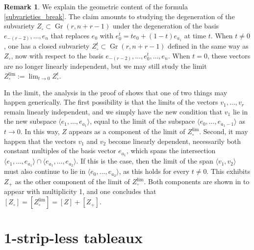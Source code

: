 \documentclass[11pt]{article}
\theoremstyle{definition}
\newtheorem{rema}[theo]{Remark}
\numberwithin{equation}{section}
\DeclareMathOperator{\Gr}{Gr}
\begin{document}

\begin{rema}\label{subvarieties_break_rmk}
We explain the geometric content of the formula \eqref{subvarieties_break}. The claim amounts to studying the degeneration of the subvariety $Z_\circ\subset \Gr(r,n+r-1)$ under the degeneration of the basis $e_{-(r-2)},\ldots,e_n$ that replaces $e_0$ with $e_0^t=te_0+(1-t)e_{a_1}$ at time $t$. When $t\neq0$, one has a closed subvariety $Z^t_\circ\subset \Gr(r,n+r-1)$ defined in the same way as $Z_\circ$, now with respect to the basis $e_{-(r-2)},\ldots,e_0^t,\ldots,e_n$. When $t=0$, these vectors are no longer linearly independent, but we may still study the limit $Z^{\lim}_\circ:=\lim_{t\to 0}Z^t_\circ$.

In the limit, the analysis in the proof of \cite[Theorem 3.32]{Cos09} shows  that one of two things may happen generically. The first possibility is that the limits of the vectors $v_1,\ldots,v_r$ remain linearly independent, and we simply have the new condition that $v_1$ lie in the new subspace $\langle e_1,\ldots,e_{a_1}\rangle$, equal to the limit of the subspace $\langle e_0,\ldots,e_{a_1-1}\rangle$ as $t\to 0$. In this way, $Z$ appears as a component of the limit of $Z^{\lim}_\circ$. Second, it may happen that the vectors $v_1$ and $v_2$ become linearly dependent, necessarily both constant multiples of the basis vector $e_{a_1}$, which spans the intersection $\langle e_1,\ldots,e_{a_1}\rangle\cap \langle e_{a_1},\ldots,e_{a_2}\rangle$. If this is the case, then the limit of the span $\langle v_1,v_2\rangle$ must also continue to lie in $\langle e_0,\ldots,e_{a_2}\rangle$, as this holds for every $t\neq0$. This exhibits $Z_+$ as the other component of the limit of $Z^{\lim}_\circ$. Both components are shown in \cite{Cos09} to appear with multiplicity 1, and one concludes that $[Z_\circ]=[Z^{\lim}_\circ]=[Z]+[Z_+]$.
\end{rema}

\section{1-strip-less tableaux}\label{stripless_sec}
\end{document}
